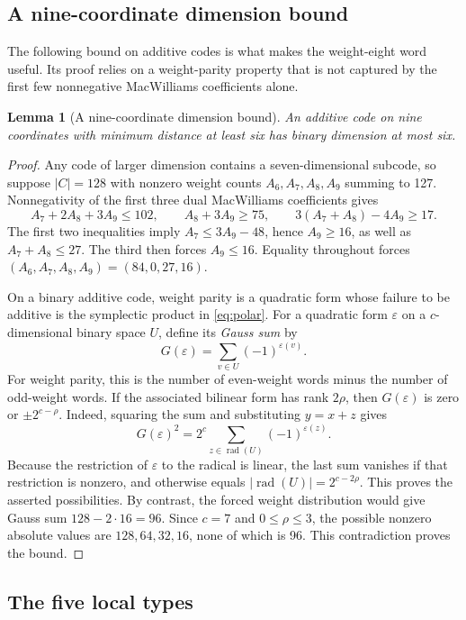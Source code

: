 \documentclass[11pt]{article}
\newtheorem{lemma}[theorem]{Lemma}
\theoremstyle{definition}
\theoremstyle{remark}
\newcommand{\rad}{\operatorname{rad}}
\begin{document}
\subsection{A nine-coordinate dimension bound}

The following bound on additive codes is what makes the weight-eight
word useful. Its proof relies on a weight-parity property that is not
captured by the first few nonnegative MacWilliams coefficients alone.

\begin{lemma}[A nine-coordinate dimension bound]\label{lem:nine-bound}
An additive code on nine coordinates with minimum distance at least six has
binary dimension at most six.
\end{lemma}
\begin{proof}
Any code of larger dimension contains a seven-dimensional subcode, so
suppose \(|C|=128\) with nonzero weight counts \(A_6,A_7,A_8,A_9\)
summing to 127. Nonnegativity of the first three dual MacWilliams
coefficients gives
\[
 A_7+2A_8+3A_9\leq102,\qquad
 A_8+3A_9\geq75,\qquad
 3(A_7+A_8)-4A_9\geq17.
\]
The first two inequalities imply \(A_7\leq3A_9-48\), hence \(A_9\geq16\),
as well as \(A_7+A_8\leq27\). The third then forces \(A_9\leq16\).
Equality throughout forces \((A_6,A_7,A_8,A_9)=(84,0,27,16)\).

On a binary additive code, weight parity is a quadratic form whose
failure to be additive is the symplectic product in \eqref{eq:polar}.
For a quadratic form \(\varepsilon\) on a \(c\)-dimensional binary space
\(U\), define its \emph{Gauss sum} by
\[
 G(\varepsilon)=\sum_{v\in U}(-1)^{\varepsilon(v)}.
\]
For weight parity, this is the number of even-weight words minus the
number of odd-weight words. If the associated bilinear form has rank
\(2\rho\), then \(G(\varepsilon)\) is zero or \(\pm2^{c-\rho}\). Indeed,
squaring the sum and substituting \(y=x+z\) gives
\[
 G(\varepsilon)^2=2^c\sum_{z\in\rad(U)}(-1)^{\varepsilon(z)}.
\]
Because the restriction of
\(\varepsilon\) to the radical is linear, the last sum vanishes if that
restriction is nonzero, and otherwise equals \(|\rad(U)|=2^{c-2\rho}\).
This proves the asserted possibilities. By contrast, the forced weight
distribution would give Gauss sum \(128-2\cdot16=96\). Since \(c=7\) and
\(0\leq\rho\leq3\), the possible nonzero absolute values are
\(128,64,32,16\), none of which is 96. This contradiction proves the
bound.
\end{proof}

\subsection{The five local types}\label{sec:types}
\end{document}
